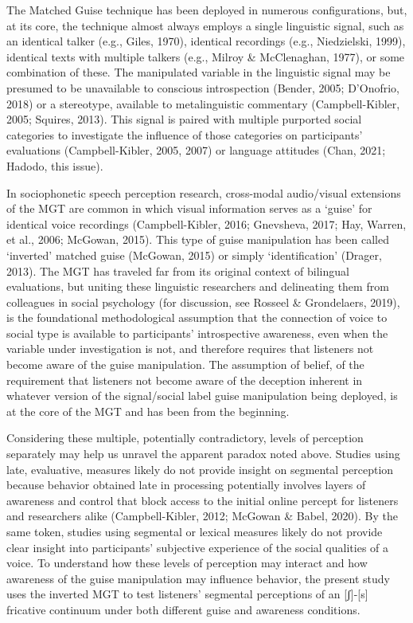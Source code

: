 \documentclass[
  letterpaper,
  DIV=11,
  numbers=noendperiod]{scrartcl}
\begin{document}
The Matched Guise technique has been deployed in numerous
configurations, but, at its core, the technique almost always employs a
single linguistic signal, such as an identical talker (e.g., Giles,
1970), identical recordings (e.g., Niedzielski, 1999), identical texts
with multiple talkers (e.g., Milroy \& McClenaghan, 1977), or some
combination of these. The manipulated variable in the linguistic signal
may be presumed to be unavailable to conscious introspection (Bender,
2005; D'Onofrio, 2018) or a stereotype, available to metalinguistic
commentary (Campbell-Kibler, 2005; Squires, 2013). This signal is paired
with multiple purported social categories to investigate the influence
of those categories on participants' evaluations (Campbell-Kibler, 2005,
2007) or language attitudes (Chan, 2021; Hadodo, this issue).

In sociophonetic speech perception research, cross-modal audio/visual
extensions of the MGT are common in which visual information serves as a
`guise' for identical voice recordings (Campbell-Kibler, 2016;
Gnevsheva, 2017; Hay, Warren, et al., 2006; McGowan, 2015). This type of
guise manipulation has been called `inverted' matched guise (McGowan,
2015) or simply `identification' (Drager, 2013). The MGT has traveled
far from its original context of bilingual evaluations, but uniting
these linguistic researchers and delineating them from colleagues in
social psychology (for discussion, see Rosseel \& Grondelaers, 2019), is
the foundational methodological assumption that the connection of voice
to social type is available to participants' introspective awareness,
even when the variable under investigation is not, and therefore
requires that listeners not become aware of the guise manipulation. The
assumption of belief, of the requirement that listeners not become aware
of the deception inherent in whatever version of the signal/social label
guise manipulation being deployed, is at the core of the MGT and has
been from the beginning.

Considering these multiple, potentially contradictory, levels of
perception separately may help us unravel the apparent paradox noted
above. Studies using late, evaluative, measures likely do not provide
insight on segmental perception because behavior obtained late in
processing potentially involves layers of awareness and control that
block access to the initial online percept for listeners and researchers
alike (Campbell-Kibler, 2012; McGowan \& Babel, 2020). By the same
token, studies using segmental or lexical measures likely do not provide
clear insight into participants' subjective experience of the social
qualities of a voice. To understand how these levels of perception may
interact and how awareness of the guise manipulation may influence
behavior, the present study uses the inverted MGT to test listeners'
segmental perceptions of an {[}ʃ{]}-{[}s{]} fricative continuum under
both different guise and awareness conditions.
\end{document}

